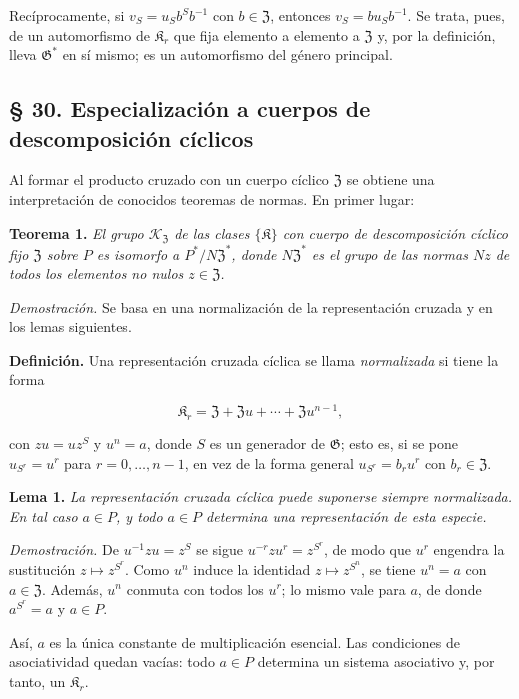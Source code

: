 Recíprocamente, si $v_S=u_Sb^Sb^{-1}$ con $b\in\mathfrak Z$, entonces $v_S=bu_Sb^{-1}$. Se trata, pues, de un automorfismo de $\mathfrak K_r$ que fija elemento a elemento a $\mathfrak Z$ y, por la definición, lleva $\mathfrak G^*$ en sí mismo; es un automorfismo del género principal.

\subsection*{§ 30. Especialización a cuerpos de descomposición cíclicos}\label{spezialisierung-auf-zyklische-zerfaellungskoerper}

Al formar el producto cruzado con un cuerpo cíclico $\mathfrak Z$ se obtiene una interpretación de conocidos teoremas de normas. En primer lugar:

\noindent\textbf{Teorema 1.} \emph{El grupo $\mathscr K_{\mathfrak Z}$ de las clases $\{\mathfrak K\}$ con cuerpo de descomposición cíclico fijo $\mathfrak Z$ sobre $P$ es isomorfo a $P^*/N\mathfrak Z^*$, donde $N\mathfrak Z^*$ es el grupo de las normas $Nz$ de todos los elementos no nulos $z\in\mathfrak Z$.}

\noindent\emph{Demostración.} Se basa en una normalización de la representación cruzada y en los lemas siguientes.

\noindent\textbf{Definición.} Una representación cruzada cíclica se llama \emph{normalizada} si tiene la forma

\[
\mathfrak K_r=\mathfrak Z+\mathfrak Zu+\cdots+\mathfrak Zu^{n-1},
\]

con $zu=uz^S$ y $u^n=a$, donde $S$ es un generador de $\mathfrak G$; esto es, si se pone $u_{S^r}=u^r$ para $r=0,\ldots,n-1$, en vez de la forma general $u_{S^r}=b_ru^r$ con $b_r\in\mathfrak Z$.

\noindent\textbf{Lema 1.} \emph{La representación cruzada cíclica puede suponerse siempre normalizada. En tal caso $a\in P$, y todo $a\in P$ determina una representación de esta especie.}

\noindent\emph{Demostración.} De $u^{-1}zu=z^S$ se sigue $u^{-r}zu^r=z^{S^r}$, de modo que $u^r$ engendra la sustitución $z\mapsto z^{S^r}$. Como $u^n$ induce la identidad $z\mapsto z^{S^n}$, se tiene $u^n=a$ con $a\in\mathfrak Z$. Además, $u^n$ conmuta con todos los $u^r$; lo mismo vale para $a$, de donde $a^{S^r}=a$ y $a\in P$.

Así, $a$ es la única constante de multiplicación esencial. Las condiciones de asociatividad quedan vacías: todo $a\in P$ determina un sistema asociativo y, por tanto, un $\mathfrak K_r$.

